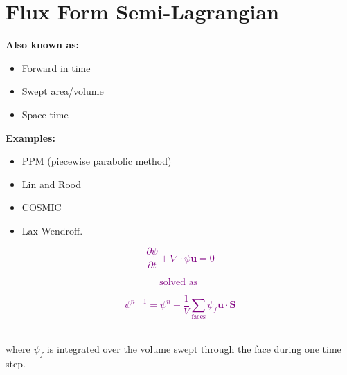 \begin{minipage}[t]{0.6\columnwidth}%

\section*{Flux Form Semi-Lagrangian}

\textbf{Also known as:}
\begin{itemize}
\item Forward in time
\item Swept area/volume
\item Space-time
\end{itemize}
\textbf{Examples: }
\begin{itemize}
\item PPM (piecewise parabolic method)
\item Lin and Rood
\item COSMIC
\item Lax-Wendroff. \nocite{LLM96,LLM95,CW84,LR96}
\end{itemize}
%
\end{minipage} %
\begin{minipage}[t]{0.38\columnwidth}%
\phantom{}\resizebox{1\textwidth}{!}{}
\begin{description}
\item [{\smiley{}}] 
\item [{\frownie{}}] 
\end{description}
%
\end{minipage}

\textcolor{purple}{}%
\begin{minipage}[t]{0.33\columnwidth}%
\begin{center}
\textcolor{purple}{
\[
\frac{\partial\psi}{\partial t}+\nabla\cdot\psi\mathbf{u}=0
\]
}
\par\end{center}%
\end{minipage}\textcolor{purple}{}%
\begin{minipage}[t]{0.2\columnwidth}%
\begin{center}
\textcolor{purple}{
\[
\text{solved as }
\]
}
\par\end{center}%
\end{minipage}\textcolor{purple}{}%
\begin{minipage}[t]{0.4\columnwidth}%
\begin{center}
\textcolor{purple}{
\[
\psi^{n+1}=\psi^{n}-\frac{1}{V}\sum_{\text{faces}}\psi_{f}\mathbf{u}\cdot\mathbf{S}
\]
}
\par\end{center}%
\end{minipage}\\
where $\psi_{f}$ is integrated over the volume swept through the
face during one time step. 

